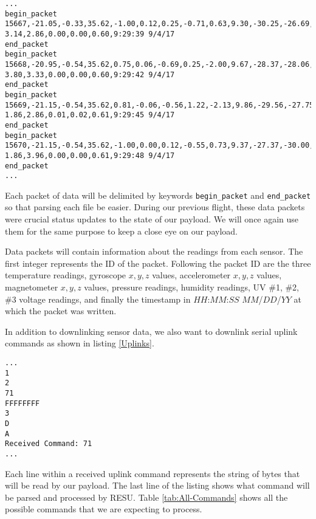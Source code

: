 \lstset{basicstyle=\small, numbers=left, xleftmargin=2em, frame=tb, label = Downlinks, framexleftmargin=1.5em}
\begin{lstlisting}[caption = Sample of downlinked data packets ID: 15667 - 15670 from SORA 2017~\cite{SORA}.]
...
begin_packet
15667,-21.05,-0.33,35.62,-1.00,0.12,0.25,-0.71,0.63,9.30,-30.25,-26.69,-60.88
3.14,2.86,0.00,0.00,0.60,9:29:39 9/4/17
end_packet
begin_packet
15668,-20.95,-0.54,35.62,0.75,0.06,-0.69,0.25,-2.00,9.67,-28.37,-28.06,-60.06
3.80,3.33,0.00,0.00,0.60,9:29:42 9/4/17
end_packet
begin_packet
15669,-21.15,-0.54,35.62,0.81,-0.06,-0.56,1.22,-2.13,9.86,-29.56,-27.75,-57.88
1.86,2.86,0.01,0.02,0.61,9:29:45 9/4/17
end_packet
begin_packet
15670,-21.15,-0.54,35.62,-1.00,0.00,0.12,-0.55,0.73,9.37,-27.37,-30.00,-58.75
1.86,3.96,0.00,0.00,0.61,9:29:48 9/4/17
end_packet
...
\end{lstlisting}
\medskip

Each packet of data will be delimited by keywords \verb|begin_packet| and \verb|end_packet| so that parsing each file be easier.  During our previous flight, these data packets were crucial status updates to the state of our payload.  We will once again use them for the same purpose to keep a close eye on our payload.

Data packets will contain information about the readings from each sensor.  The first integer represents the ID of the packet.  Following the packet ID are the three temperature readings, gyroscope $x, y, z$ values, accelerometer $x, y, z$ values, magnetometer $x, y, z$ values, pressure readings, humidity readings, UV \#1, \#2, \#3 voltage readings, and finally the timestamp in $HH$:$MM$:$SS$ $MM$/$DD$/$YY$ at which the packet was written.  

In addition to downlinking sensor data, we also want to downlink serial uplink commands as shown in listing \ref{Uplinks}.  

\lstset{basicstyle=\small, numbers=left, frame=tb, linewidth=11.5cm, xleftmargin=.4\textwidth, label = Uplinks}
\begin{lstlisting}[caption = Sample of received uplink commands in downlinked packets in SORA 2017~\cite{SORA}]
...
1
2
71
FFFFFFFF
3
D
A
Received Command: 71
...
\end{lstlisting}
\medskip

Each line within a received uplink command represents the string of bytes that will be read by our payload.  The last line of the listing shows what command will be parsed and processed by RESU.  Table \ref{tab:All-Commands} shows all the possible commands that we are expecting to process. 
